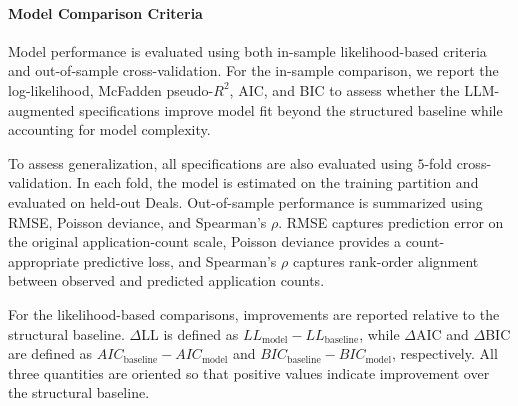 \paragraph{Model Comparison Criteria}

Model performance is evaluated using both in-sample likelihood-based criteria and out-of-sample cross-validation. For the in-sample comparison, we report the log-likelihood, McFadden pseudo-$R^2$, AIC, and BIC to assess whether the LLM-augmented specifications improve model fit beyond the structured baseline while accounting for model complexity.

To assess generalization, all specifications are also evaluated using $5$-fold cross-validation. In each fold, the model is estimated on the training partition and evaluated on held-out Deals. Out-of-sample performance is summarized using RMSE, Poisson deviance, and Spearman's $\rho$. RMSE captures prediction error on the original application-count scale, Poisson deviance provides a count-appropriate predictive loss, and Spearman's $\rho$ captures rank-order alignment between observed and predicted application counts.

For the likelihood-based comparisons, improvements are reported relative to the structural baseline. $\Delta$LL is defined as $LL_{\text{model}} - LL_{\text{baseline}}$, while $\Delta$AIC and $\Delta$BIC are defined as $AIC_{\text{baseline}} - AIC_{\text{model}}$ and $BIC_{\text{baseline}} - BIC_{\text{model}}$, respectively. All three quantities are oriented so that positive values indicate improvement over the structural baseline.




